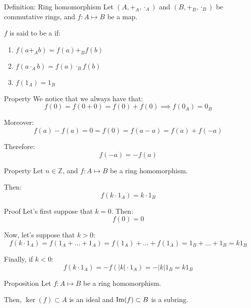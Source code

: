 \documentclass[a4paper]{article}
\begin{document}
\begin{parag}{Definition: Ring homomorphism}
    Let $\left(A, +_A, \cdot_A \right)$ and $\left(B, +_B, \cdot_B \right)$ be commutative rings, and $f: A \mapsto B$ be a map.

    $f$ is said to be a  if:
    \begin{enumerate}
        \item $f\left(a +_A b\right) = f\left(a\right) +_B f\left(b\right)$
        \item $f\left(a\cdot_A b\right) = f\left(a\right)\cdot_B f\left(b\right)$
        \item $f\left(1_A\right) = 1_B$
    \end{enumerate}

    \begin{subparag}{Property}
        We notice that we always  have that: 
        \[f\left(0\right)= f\left(0 + 0\right) = f\left(0\right) + f\left(0\right) \implies f\left(0_A\right) = 0_B\]

        Moreover: 
        \[f\left(a\right) - f\left(a\right) = 0 = f\left(0\right) = f\left(a - a\right) = f\left(a\right) + f\left(-a\right)\]
        
        Therefore: 
        \[f\left(-a\right) = -f\left(a\right)\]
    \end{subparag}
\end{parag}

\begin{parag}{Property}
    Let $n \in \mathbb{Z}$, and $f: A \mapsto B$ be a ring homomorphism.

    Then: 
    \[f\left(k\cdot 1_A\right) = k\cdot 1_B\]
    
    \begin{subparag}{Proof}
        Let's first suppose that $k = 0$. Then: 
        \[f\left(0\right) = 0\]
        
        Now, let's suppose that $k > 0$: 
        \[f\left(k\cdot 1_A\right) = f\left(1_A + \ldots + 1_A\right) = f\left(1_A\right) + \ldots + f\left(1_A\right) = 1_B + \ldots + 1_B = k 1_B\]
        
        Finally, if $k < 0$: 
        \[f\left(k \cdot 1_A\right) = -f\left(\left|k\right| \cdot 1_A\right) = -\left|k\right| 1_B = k 1_B\]
    \end{subparag}
\end{parag}


\begin{parag}{Proposition}
    Let $f: A \mapsto B$ be a ring homomorphism.

    Then, $\ker\left(f\right) \subset A$ is an ideal and $\im\left(f\right) \subset B$ is a subring.
\end{parag}
\end{document}

